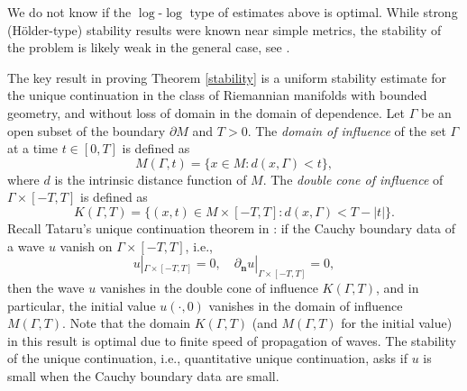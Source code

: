 \documentclass[11pt,letterpaper]{amsart}
\numberwithin{equation}{section}
\theoremstyle{definition}
\theoremstyle{plain}
\theoremstyle{definition}
\theoremstyle{plain}
\theoremstyle{definition}
\theoremstyle{plain}
\begin{document}
We do not know if the $\log$-$\log$ type of estimates above is optimal.
While strong (H\"older-type) stability results \cite{BD,SU,SU2} were known near simple metrics, the stability of the problem is likely weak in the general case, see \cite{KRS,M}.

\smallskip
The key result in proving Theorem \ref{stability} is a uniform stability estimate for the unique continuation in the class of Riemannian manifolds with bounded geometry, and without loss of domain in the domain of dependence.
Let $\Gamma$ be an open subset of the boundary $\partial M$ and $T>0$. The \emph{domain of influence} of the set $\Gamma$ at a time $t\in [0,T]$ is defined as
\begin{equation}\label{def-Mt}
M(\Gamma,t)=\big\{x\in M: d(x,\Gamma)<t \big\},
\end{equation}
where $d$ is the intrinsic distance function of $M$. 
The \emph{double cone of influence} of $\Gamma\times [-T,T]$ is defined as
\begin{equation}\label{def-Kcone}
K(\Gamma,T)=\big\{(x,t)\in M\times [-T,T] : d(x,\Gamma)< T-|t| \big\}.
\end{equation}
Recall Tataru's unique continuation theorem in \cite{T}: if the Cauchy boundary data of a wave $u$ vanish on $\Gamma\times [-T,T]$, i.e.,
$$u|_{\Gamma\times [-T,T]}=0,\quad \partial_{\textbf{n}}u |_{\Gamma \times [-T,T]}=0,$$
then the wave $u$ vanishes in the double cone of influence $K(\Gamma,T)$, and in particular, the initial value $u(\cdot,0)$ vanishes in the domain of influence $M(\Gamma,T)$. 
Note that the domain $K(\Gamma,T)$ (and $M(\Gamma,T)$ for the initial value) in this result is optimal due to finite speed of propagation of waves.
The stability of the unique continuation, i.e., quantitative unique continuation, asks if $u$ is small when the Cauchy boundary data are small.
\end{document}
